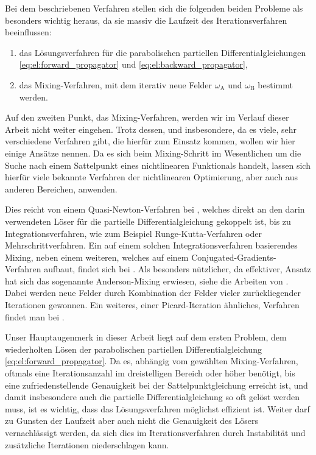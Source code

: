 Bei dem beschriebenen Verfahren stellen sich die folgenden beiden Probleme als besonders wichtig heraus, da sie massiv die Laufzeit des Iterationsverfahren beeinflussen:
\begin{enumerate}[label={\itshape\roman*.}]
    \item das Lösungsverfahren für die parabolischen partiellen Differentialgleichungen \cref{eq:el:forward_propagator} und \cref{eq:el:backward_propagator},
    \item das Mixing-Verfahren, mit dem iterativ neue Felder $\omega_{\mathrm{A}}$ und $\omega_{\mathrm{B}}$ bestimmt werden.
\end{enumerate}

Auf den zweiten Punkt, das Mixing-Verfahren, werden wir im Verlauf dieser Arbeit nicht weiter eingehen.
Trotz dessen, und insbesondere, da es viele, sehr verschiedene Verfahren gibt, die hierfür zum Einsatz kommen, wollen wir hier einige Ansätze nennen.
Da es sich beim Mixing-Schritt im Wesentlichen um die Suche nach einem Sattelpunkt eines nichtlinearen Funktionals handelt, lassen sich hierfür viele bekannte Verfahren der nichtlinearen Optimierung, aber auch aus anderen Bereichen, anwenden.

Dies reicht von einem Quasi-Newton-Verfahren bei \textcite{Matsen:1994bz}, welches direkt an den darin verwendeten Löser für die partielle Differentialgleichung gekoppelt ist, bis zu Integrationsverfahren, wie zum Beispiel Runge-Kutta-Verfahren oder Mehrschrittverfahren.
Ein auf einem solchen Integrationsverfahren basierendes Mixing, neben einem weiteren, welches auf einem Conjugated-Gradients-Verfahren aufbaut, findet sich bei \textcite{Ceniceros:2006is}.
Als besonders nützlicher, da effektiver, Ansatz hat sich das sogenannte Anderson-Mixing erwiesen, siehe die Arbeiten von \textcite{Thompson:2004um,Stasiak:2011ba}.
Dabei werden neue Felder durch Kombination der Felder vieler zurückliegender Iterationen gewonnen.
Ein weiteres, einer Picard-Iteration ähnliches, Verfahren findet man bei \textcite{Drolet:1999bs}.

Unser Hauptaugenmerk in dieser Arbeit liegt auf dem ersten Problem, dem wiederholten Lösen der parabolischen partiellen Differentialgleichung \cref{eq:el:forward_propagator}.
Da es, abhängig vom gewählten Mixing-Verfahren, oftmals eine Iterationsanzahl im dreistelligen Bereich oder höher benötigt, bis eine zufriedenstellende Genauigkeit bei der Sattelpunktgleichung erreicht ist, und damit insbesondere auch die partielle Differentialgleichung so oft gelöst werden muss, ist es wichtig, dass das Lösungsverfahren möglichst effizient ist.
Weiter darf zu Gunsten der Laufzeit aber auch nicht die Genauigkeit des Lösers vernachlässigt werden, da sich dies im Iterationsverfahren durch Instabilität und zusätzliche Iterationen niederschlagen kann.

